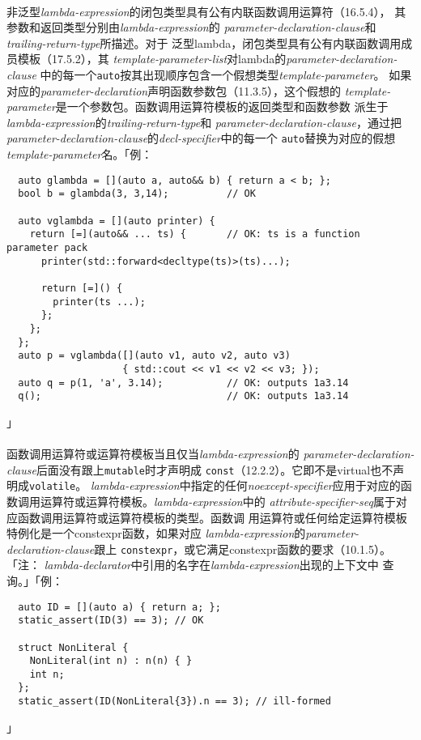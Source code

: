 \paragraph{}
非泛型\textit{lambda-expression}的闭包类型具有公有内联函数调用运算符（16.5.4），
其参数和返回类型分别由\textit{lambda-expression}的
\textit{parameter-declaration-clause}和\textit{trailing-return-type}所描述。对于
泛型lambda，闭包类型具有公有内联函数调用成员模板（17.5.2），其
\textit{template-parameter-list}对lambda的\textit{parameter-declaration-clause}
中的每一个\texttt{auto}按其出现顺序包含一个假想类型\textit{template-parameter}。
如果对应的\textit{parameter-declaration}声明函数参数包（11.3.5），这个假想的
\textit{template-parameter}是一个参数包。函数调用运算符模板的返回类型和函数参数
派生于\textit{lambda-expression}的\textit{trailing-return-type}和
\textit{parameter-declaration-clause}，通过把
\textit{parameter-declaration-clause}的\textit{decl-specifier}中的每一个
\texttt{auto}替换为对应的假想\textit{template-parameter}名。「例：
\begin{lstlisting}
  auto glambda = [](auto a, auto&& b) { return a < b; };
  bool b = glambda(3, 3,14);          // OK

  auto vglambda = [](auto printer) {
    return [=](auto&& ... ts) {       // OK: ts is a function parameter pack
      printer(std::forward<decltype(ts)>(ts)...);

      return [=]() {
        printer(ts ...);
      };
    };
  };
  auto p = vglambda([](auto v1, auto v2, auto v3)
                    { std::cout << v1 << v2 << v3; });
  auto q = p(1, 'a', 3.14);           // OK: outputs 1a3.14
  q();                                // OK: outputs 1a3.14
\end{lstlisting}」

\paragraph{}
函数调用运算符或运算符模板当且仅当\textit{lambda-expression}的
\textit{parameter-declaration-clause}后面没有跟上\texttt{mutable}时才声明成
\texttt{const}（12.2.2）。它即不是virtual也不声明成\texttt{volatile}。
\textit{lambda-expression}中指定的任何\textit{noexcept-specifier}应用于对应的函
数调用运算符或运算符模板。\textit{lambda-expression}中的
\textit{attribute-specifier-seq}属于对应函数调用运算符或运算符模板的类型。函数调
用运算符或任何给定运算符模板特例化是一个constexpr函数，如果对应
\textit{lambda-expression}的\textit{parameter-declaration-clause}跟上
\texttt{constexpr}，或它满足constexpr函数的要求（10.1.5）。「注：
\textit{lambda-declarator}中引用的名字在\textit{lambda-expression}出现的上下文中
查询。」「例：
\begin{lstlisting}
  auto ID = [](auto a) { return a; };
  static_assert(ID(3) == 3); // OK

  struct NonLiteral {
    NonLiteral(int n) : n(n) { }
    int n;
  };
  static_assert(ID(NonLiteral{3}).n == 3); // ill-formed
\end{lstlisting}」

